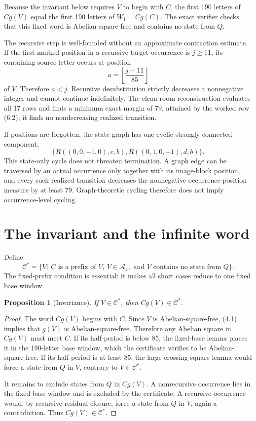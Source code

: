 \documentclass[11pt]{article}
\newtheorem{proposition}[theorem]{Proposition}
\theoremstyle{definition}
\newcommand{\A}{\mathcal A_4}
\begin{document}
Because the invariant below requires $V$ to begin with $C$, the first 190 letters of $Cg(V)$ equal the first 190 letters of $W_1=Cg(C)$. The exact verifier checks that this fixed word is Abelian-square-free and contains no state from $Q$.

The recursive step is well-founded without an approximate contraction estimate. If the first marked position in a recursive target occurrence is $j\ge11$, its containing source letter occurs at position
\[
a=\left\lfloor\frac{j-11}{85}\right\rfloor
\]
of $V$. Therefore $a<j$. Recursive desubstitution strictly decreases a nonnegative integer and cannot continue indefinitely. The clean-room reconstruction evaluates all 17 rows and finds a minimum exact margin of 79, attained by the worked row (6.2); it finds no nondecreasing realized transition.

If positions are forgotten, the state graph has one cyclic strongly connected component,
\[
\{R((0,0,-1,0),c,b),R((0,1,0,-1),d,b)\}.
\]
This state-only cycle does not threaten termination. A graph edge can be traversed by an actual occurrence only together with its image-block position, and every such realized transition decreases the nonnegative occurrence-position measure by at least 79. Graph-theoretic cycling therefore does not imply occurrence-level cycling.

\section{The invariant and the infinite word}

Define
\[
\mathcal C^*=\{V:\ C\text{ is a prefix of }V,\ V\in\A,\text{ and }V\text{ contains no state from }Q\}.
\tag{8.1}
\]
The fixed-prefix condition is essential: it makes all short cases reduce to one fixed base window.

\begin{proposition}[Invariance]
If $V\in\mathcal C^*$, then $Cg(V)\in\mathcal C^*$.
\end{proposition}

\begin{proof}
The word $Cg(V)$ begins with $C$. Since $V$ is Abelian-square-free, (4.1) implies that $g(V)$ is Abelian-square-free. Therefore any Abelian square in $Cg(V)$ must meet $C$. If its half-period is below 85, the fixed-base lemma places it in the 190-letter base window, which the certificate verifies to be Abelian-square-free. If its half-period is at least 85, the large crossing-square lemma would force a state from $Q$ in $V$, contrary to $V\in\mathcal C^*$.

It remains to exclude states from $Q$ in $Cg(V)$. A nonrecursive occurrence lies in the fixed base window and is excluded by the certificate. A recursive occurrence would, by recursive residual closure, force a state from $Q$ in $V$, again a contradiction. Thus $Cg(V)\in\mathcal C^*$.
\end{proof}
\end{document}
